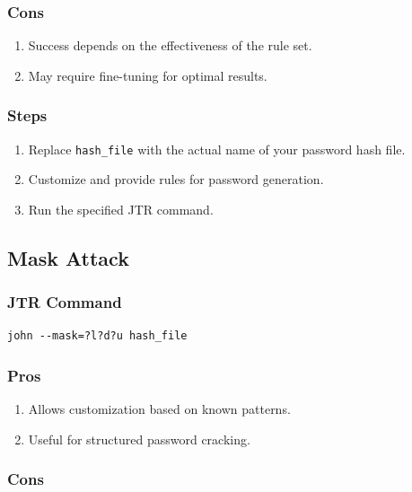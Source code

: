 \documentclass[11pt]{article}
\begin{document}
\subsubsection{Cons}

\begin{enumerate}
    \item Success depends on the effectiveness of the rule set.
    \item May require fine-tuning for optimal results.
\end{enumerate}

\subsubsection{Steps}

\begin{enumerate}
    \item Replace \texttt{hash\_file} with the actual name of your password hash file.
    \item Customize and provide rules for password generation.
    \item Run the specified JTR command.
\end{enumerate}



\subsection{Mask Attack}

\subsubsection{JTR Command}

\begin{verbatim}
john --mask=?l?d?u hash_file
\end{verbatim}

\subsubsection{Pros}

\begin{enumerate}
    \item Allows customization based on known patterns.
    \item Useful for structured password cracking.
\end{enumerate}

\subsubsection{Cons}
\end{document}
